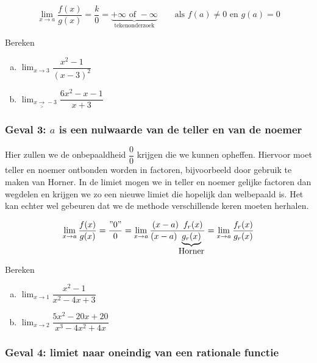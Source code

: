 \documentclass[12pt,twoside,a4paper]{article}
\newenvironment{eigenschap}
{
  \vspace{0.4cm}
  \begin{mdframed}[nobreak=true,frametitle={Eigenschap}]
  }{%
  \end{mdframed}
}
\begin{document}
\begin{eigenschap}
  $$\lim_{x\to a}\dfrac{f(x)}{g(x)}=\dfrac{k}{0}=\underbrace{+\infty \mbox{ of } -\infty}_{\mbox{tekenonderzoek}} \qquad \mbox{als $f(a)\neq0$ en $g(a)=0$}$$
\end{eigenschap}

\begin{oefening}
  Bereken
  \begin{enumerate}[(a)]
  \itemsep.5em
  \item $\displaystyle\lim_{x\to3}\dfrac{x^2-1}{(x-3)^2}$
  \item $\displaystyle\lim_{x\underset{>}{\to}-3}\dfrac{6x^2-x-1}{x+3}$
  \end{enumerate}
\end{oefening}

\subsubsection*{Geval 3: $a$ is een nulwaarde van de teller en van de noemer}

Hier zullen we de onbepaaldheid $\dfrac{0}{0}$ krijgen die we kunnen opheffen. Hiervoor moet teller en noemer ontbonden worden in factoren, bijvoorbeeld door gebruik te maken van Horner. In de limiet mogen we in teller en noemer gelijke factoren dan wegdelen en krijgen we zo een nieuwe limiet die hopelijk dan welbepaald is. Het kan echter wel gebeuren dat we de methode verschillende keren moeten herhalen.

\begin{eigenschap}
  $$\lim_{x\to a}\dfrac{f(x)}{g(x)}=\dfrac{"0"}{0}=\lim_{x\to a}\dfrac{(x-a)\;\;f_r(x)}{(x-a)\underbrace{g_r(x)}_{\mbox{Horner}}}=\lim_{x\to a}\dfrac{f_r(x)}{g_r(x)}$$
\end{eigenschap}

\begin{oefening}
  Bereken
  \begin{enumerate}[(a)]
  \itemsep.5em
  \item $\displaystyle\lim_{x\to1}\dfrac{x^2-1}{x^2-4x+3}$
  \item $\displaystyle\lim_{x\to2}\dfrac{5x^2-20x+20}{x^3-4x^2+4x}$
  \end{enumerate}
\end{oefening}

\subsubsection*{Geval 4: limiet naar oneindig van een rationale functie}
\end{document}
